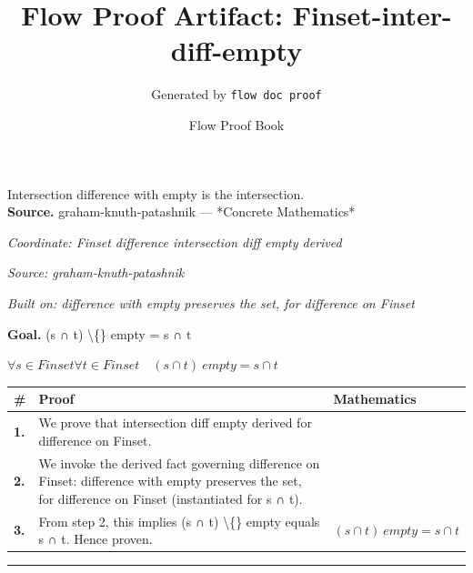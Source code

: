 \documentclass[11pt]{article}
\title{Flow Proof Artifact: Finset-inter-diff-empty}
\author{Generated by \texttt{flow doc proof}}
\date{Flow Proof Book}
\theoremstyle{definition}
\begin{document}
\maketitle
Intersection difference with empty is the intersection.\\[0.5em]
\textbf{Source.} graham-knuth-patashnik — *Concrete Mathematics*\\[0.5em]
\bigskip
{}\par
\smallskip\noindent\textit{Coordinate: Finset \cdot difference \cdot intersection diff empty derived}\par
\smallskip\noindent\textit{Source: graham-knuth-patashnik}\par
\smallskip\noindent\textit{Built on: difference with empty preserves the set, for difference on Finset}\par
\medskip
\noindent\textbf{Goal.} (s ∩ t) \textbackslash\{\} empty = s ∩ t\par
\noindent$\displaystyle \forall s \in Finset \forall t \in Finset\quad (s ∩ t) \ empty = s ∩ t$\par
\medskip
\noindent
\begin{tabular}{@{} >{\raggedright\arraybackslash}p{} >{\raggedright\arraybackslash}p{} >{\raggedleft\arraybackslash}p{} @{}}
\textbf{\#} & \textbf{Proof} & \textbf{Mathematics} \\
\midrule
\textbf{1.} & We prove that intersection diff empty derived for difference on Finset. & \\[0.45em]
\textbf{2.} & We invoke the derived fact governing difference on Finset: difference with empty preserves the set, for difference on Finset (instantiated for s ∩ t). & \\[0.45em]
\textbf{3.} & From step 2, this implies (s ∩ t) \textbackslash\{\} empty equals s ∩ t. Hence proven. & $\displaystyle (s ∩ t) \ empty = s ∩ t$ \\[0.45em]
\bottomrule
\end{tabular}
\label{thm:Finset-difference-intersection_diff_empty_derived}
\par\medskip\hrule
\end{document}
